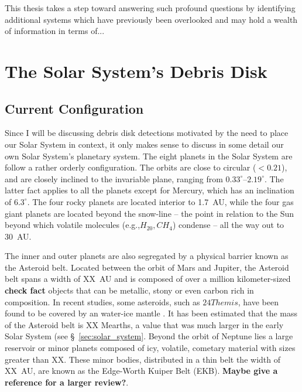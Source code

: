     This thesis takes a step toward answering such profound questions by identifying additional systems which have previously been overlooked and may hold a wealth of information in terms of...
    
    
    
\section{The Solar System's Debris Disk}\label{sec:ch1_ssdisk}

     \subsection{Current Configuration}
    
    Since I will be discussing debris disk detections motivated by the need to place our Solar System in context, it only makes sense to discuss in some detail our own Solar System's planetary system. The eight planets in the Solar System are follow a rather orderly configuration. The orbits are close to circular ($<0.21$), and are closely inclined to the invariable plane, ranging from $0.33^{\circ}$--$2.19^{\circ}$. The latter fact applies to all the planets except for Mercury, which has an inclination of $6.3^{\circ}$. The four rocky planets are located interior to 1.7~AU, while the four gas giant planets are located beyond the snow-line -- the point in relation to the Sun beyond which volatile molecules (e.g.,$H_20, CH_4$) condense -- all the way out to 30~AU. 
    
    
    
    
    The inner and outer planets are also segregated by a physical barrier known as the Asteroid belt. Located between the orbit of Mars and Jupiter, the Asteroid belt spans a width of XX~AU and is composed of over a million kilometer-sized \textbf{check fact} objects that can be metallic, stony or even carbon rich in composition. In recent studies, some asteroids, such as $24 Themis$, have been found to be covered by an water-ice mantle \citep{Campins2010}. It has been estimated that the mass of the Asteroid belt is XX Mearths, a value that was much larger in the early Solar System (see \S~\ref{sec:solar_system}. Beyond the orbit of Neptune lies a large reservoir or minor planets composed of icy, volatile, cometary material with sizes greater than XX. These minor bodies, distributed in a thin belt the width of XX~AU, are known as the Edge-Worth Kuiper Belt (EKB). \textbf{Maybe give a reference for a larger review?}.
    
